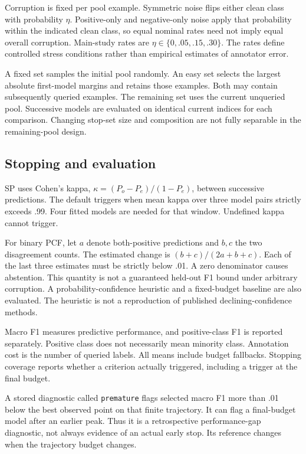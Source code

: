 \documentclass[10pt,twocolumn]{article}
\begin{document}
Corruption is fixed per pool example. Symmetric noise flips either clean class with probability $\eta$. Positive-only and negative-only noise apply that probability within the indicated clean class, so equal nominal rates need not imply equal overall corruption. Main-study rates are $\eta\in\{0,.05,.15,.30\}$. The rates define controlled stress conditions rather than empirical estimates of annotator error.

A fixed set samples the initial pool randomly. An easy set selects the largest absolute first-model margins and retains those examples. Both may contain subsequently queried examples. The remaining set uses the current unqueried pool. Successive models are evaluated on identical current indices for each comparison. Changing stop-set size and composition are not fully separable in the remaining-pool design.

\subsection{Stopping and evaluation}
SP uses Cohen's kappa, $\kappa=(P_o-P_e)/(1-P_e)$, between successive predictions. The default triggers when mean kappa over three model pairs strictly exceeds .99. Four fitted models are needed for that window. Undefined kappa cannot trigger.

For binary PCF, let $a$ denote both-positive predictions and $b,c$ the two disagreement counts. The estimated change is $(b+c)/(2a+b+c)$. Each of the last three estimates must be strictly below .01. A zero denominator causes abstention. This quantity is not a guaranteed held-out F1 bound under arbitrary corruption. A probability-confidence heuristic and a fixed-budget baseline are also evaluated. The heuristic is not a reproduction of published declining-confidence methods.

Macro F1 measures predictive performance, and positive-class F1 is reported separately. Positive class does not necessarily mean minority class. Annotation cost is the number of queried labels. All means include budget fallbacks. Stopping coverage reports whether a criterion actually triggered, including a trigger at the final budget.

A stored diagnostic called \texttt{premature} flags selected macro F1 more than .01 below the best observed point on that finite trajectory. It can flag a final-budget model after an earlier peak. Thus it is a retrospective performance-gap diagnostic, not always evidence of an actual early stop. Its reference changes when the trajectory budget changes.
\end{document}
